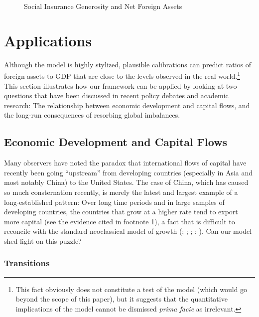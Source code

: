 \documentclass[titlepage,abstract,letterpaper]{econtex}
\begin{document}
\medskip
\begin{figure}
\caption{Social Insurance Generosity and Net Foreign Assets}\label{fig:socIns}
\end{figure}

\medskip



\section{Applications}

Although the model is highly stylized, plausible calibrations can
predict ratios of foreign assets to GDP that are close to the levels
observed in the real world.\footnote{This fact obviously does not constitute a
test of the model (which would go beyond the scope of this paper), but
it suggests that the quantitative implications of the model cannot be
dismissed {\it prima facie} as irrelevant.} This section illustrates
how our framework can be applied by looking at two questions that have
been discussed in recent policy debates and academic research: The
relationship between economic development and capital flows, and the
long-run consequences of resorbing global imbalances.

\subsection{Economic Development and Capital Flows}

Many observers have noted the paradox that international flows of
capital have recently been going ``upstream'' from developing
countries (especially in Asia and most notably China) to the United
States. The case of China, which has caused so much consternation
recently, is merely the latest and largest example of a
long-established pattern: Over long time periods and in large samples
of developing countries, the countries that grow at a higher rate tend
to export more capital (see the evidence cited in footnote 1), a fact
that is difficult to reconcile with the standard neoclassical model of
growth (\cite{carroll&weil:crcs}; \cite{cow:habits};
\cite{gourinchasJeannePuzzle}; \cite{prs:brookings};
\cite{sandriGrowth}). Can our model shed light on this
puzzle?

\subsubsection{Transitions}
\end{document}
